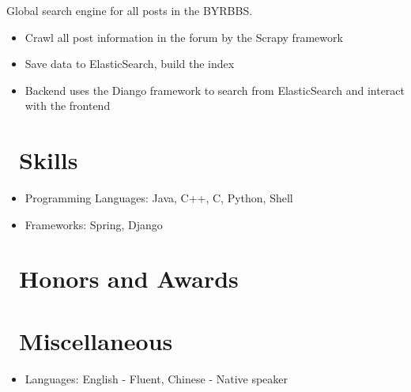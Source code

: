 \documentclass{resume}
\begin{document}
Global search engine for all posts in the BYRBBS.
\begin{itemize}
  \item Crawl all post information in the forum by the Scrapy framework
  \item Save data to ElasticSearch, build the index
  \item Backend uses the Diango framework to search from ElasticSearch and interact with the frontend
\end{itemize}



\section{\faCogs\ Skills}
\begin{itemize}[parsep=0.5ex]
  \item Programming Languages: Java, C++, C, Python, Shell
  \item Frameworks: Spring, Django
\end{itemize}

\section{\faHeartO\ Honors and Awards}

\section{\faInfo\ Miscellaneous}
\begin{itemize}[parsep=0.5ex]
  \item Languages: English - Fluent, Chinese - Native speaker
\end{itemize}

%
%
\end{document}
